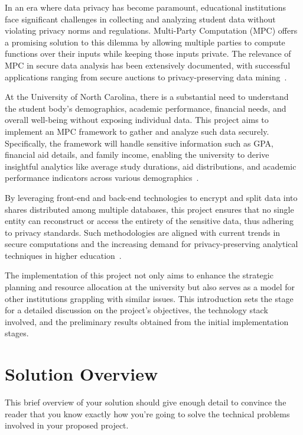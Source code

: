 \documentclass[conference]{IEEEtran}
\begin{document}
In an era where data privacy has become paramount, educational institutions face significant challenges in collecting and analyzing student data without violating privacy norms and regulations. Multi-Party Computation (MPC) offers a promising solution to this dilemma by allowing multiple parties to compute functions over their inputs while keeping those inputs private. The relevance of MPC in secure data analysis has been extensively documented, with successful applications ranging from secure auctions to privacy-preserving data mining~\cite{MPC1}.

At the University of North Carolina, there is a substantial need to understand the student body's demographics, academic performance, financial needs, and overall well-being without exposing individual data. This project aims to implement an MPC framework to gather and analyze such data securely. Specifically, the framework will handle sensitive information such as GPA, financial aid details, and family income, enabling the university to derive insightful analytics like average study durations, aid distributions, and academic performance indicators across various demographics~\cite{MPC2}.

By leveraging front-end and back-end technologies to encrypt and split data into shares distributed among multiple databases, this project ensures that no single entity can reconstruct or access the entirety of the sensitive data, thus adhering to privacy standards. Such methodologies are aligned with current trends in secure computations and the increasing demand for privacy-preserving analytical techniques in higher education~\cite{PrivacyTrends}.

The implementation of this project not only aims to enhance the strategic planning and resource allocation at the university but also serves as a model for other institutions grappling with similar issues. This introduction sets the stage for a detailed discussion on the project's objectives, the technology stack involved, and the preliminary results obtained from the initial implementation stages.

\section{Solution Overview}

This brief overview of your solution should give enough detail to convince the reader that you know exactly how you're going to solve the technical problems involved in your proposed project.
\end{document}
